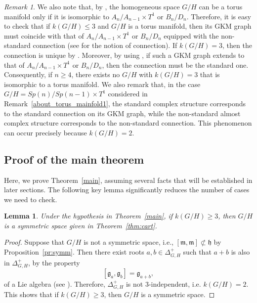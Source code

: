\documentclass{amsart}
\newtheorem{lemma}[theorem]{Lemma}
\theoremstyle{definition}
\theoremstyle{remark}
\newtheorem{remark}[theorem]{Remark}
\numberwithin{equation}{section}
\begin{document}
\begin{remark}
\label{about_torus_mainfold2}
We also note that, by \cite{Ku09}, the homogeneous space $G/H$ can be a torus manifold only if it is isomorphic to $A_{n}/A_{n-1}\times T^{1}$ or $B_{n}/D_{n}$. 
Therefore, it is easy to check that if $k(G/H)\le 3$ and $G/H$ is a torus manifold, then its GKM graph must coincide with that of $A_{n}/A_{n-1}\times T^{1}$ or $B_{n}/D_{n}$ equipped with the non-standard connection (see \cite{GZ, Ku19} for the notion of connection).
If $k(G/H)=3$, then the connection is unique by \cite{GZ}.
Moreover, by using \cite{Ku19}, if such a GKM graph extends to that of $A_{n}/A_{n-1}\times T^{1}$ or $B_{n}/D_{n}$, then the connection must be the standard one.
Consequently, if $n\ge 4$, there exists no $G/H$ with $k(G/H)=3$ that is isomorphic to a torus manifold.
We also remark that, in the case $G/H=Sp(n)/Sp(n-1)\times T^{1}$ considered in Remark~\ref{about_torus_mainfold1}, the standard complex structure corresponds to the standard connection on its GKM graph, while the non-standard almost complex structure corresponds to the non-standard connection.
This phenomenon can occur precisely because $k(G/H)=2$.
\end{remark}

\subsection{Proof of the main theorem}
\label{sect:3.2}
Here, we prove Theorem~\ref{main}, assuming several facts that will be established in later sections.
The following key lemma significantly reduces the number of cases we need to check.

\begin{lemma}\label{auxiliary lemma}
Under the hypothesis in Theorem~\ref{main}, 
if $k(G/H)\ge 3$, then  $G/H$ is a symmetric space given in Theorem~\ref{thm:cart}.
\end{lemma}
\begin{proof}
Suppose that $G/H$ is not a symmetric space, i.e., $[\mathfrak{m},\mathfrak{m}]\not\subset \mathfrak{h}$ by Proposition~\ref{pr:symm}.
Then there exist roots $a,b\in \Delta^{+}_{G,H}$ such that $a+b$ is also in $\Delta^{+}_{G,H}$, by the property
\begin{equation}\label{eq:lbprop}
[\mathfrak{g}_{a},\mathfrak{g}_{b}]=\mathfrak{g}_{a+b},
\end{equation}
of a Lie algebra (see \cite[Ch III, Theorem 4.3 (iv)]{He}).
Therefore, $\Delta^{+}_{G,H}$ is not $3$-independent, i.e. $k(G/H)=2$.
This shows that if $k(G/H)\ge 3$, then $G/H$ is a symmetric space.
\end{proof}
\end{document}
